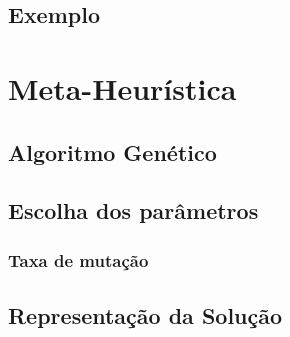 \documentclass[10pt]{scrartcl}
\begin{document}
\subsection{Exemplo}


\section{Meta-Heurística}

\subsection{Algoritmo Genético}

\subsection{Escolha dos parâmetros}

\subsubsection{Taxa de mutação}

\subsection{Representação da Solução}



\end{document}
